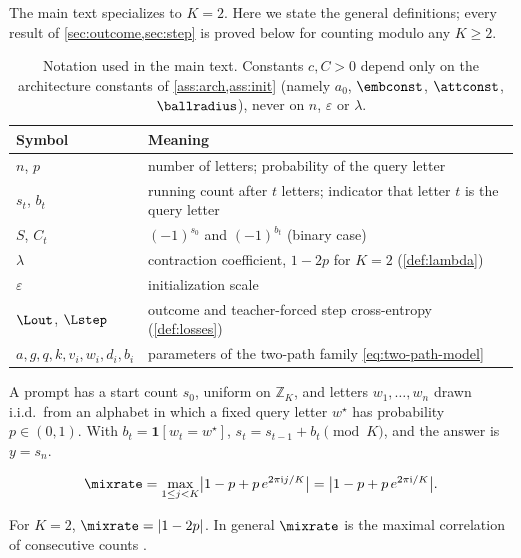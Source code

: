 \label{app:setup}
The main text specializes to $K=2$. Here we state the general definitions; every result of
\cref{sec:outcome,sec:step} is proved below for counting modulo any $K\ge2$.

\begin{table}[H]
\centering\small
\caption{Notation used in the main text. Constants $c,C>0$ depend only on the architecture constants of
\cref{ass:arch,ass:init} (namely $a_0$, $\embconst$, $\attconst$, $\ballradius$), never on $n$, $\varepsilon$ or $\lambda$.}
\label{tab:notation}
\begin{tabular}{@{}ll@{}}
\toprule
Symbol & Meaning\\
\midrule
$n$, $p$ & number of letters; probability of the query letter\\
$s_t$, $b_t$ & running count after $t$ letters; indicator that letter $t$ is the query letter\\
$S$, $C_t$ & $(-1)^{s_0}$ and $(-1)^{b_t}$ (binary case)\\
$\lambda$ & contraction coefficient, $1-2p$ for $K=2$ (\cref{def:lambda})\\
$\varepsilon$ & initialization scale\\
$\Lout$, $\Lstep$ & outcome and teacher-forced step cross-entropy (\cref{def:losses})\\
$a,g,q,k,v_i,w_i,d_i,b_i$ & parameters of the two-path family \cref{eq:two-path-model}\\
\bottomrule
\end{tabular}
\end{table}

\begin{definition}
\label{def:task}
A prompt has a start count $s_0$, uniform on $\mathbb Z_K$, and letters $w_1,\ldots,w_n$ drawn i.i.d.\ from an alphabet
in which a fixed query letter $w^\star$ has probability $p\in(0,1)$. With $b_t=\mathbf 1[w_t=w^\star]$,
$s_t=s_{t-1}+b_t\pmod K$, and the answer is $y=s_n$.
\end{definition}

\begin{definition}
\label{def:lambda}
\begin{equation}
 \mixrate=\max_{1\le j<K}\bigl|1-p+p\,e^{2\pi\mathrm ij/K}\bigr|=\bigl|1-p+p\,e^{2\pi\mathrm i/K}\bigr|.
 \label{eq:lambda}
\end{equation}
\end{definition}
For $K=2$, $\mixrate=|1-2p|$. In general $\mixrate$ is the maximal correlation of consecutive counts
\citep{witsenhausen1975sequences,raginsky2016strong}.

